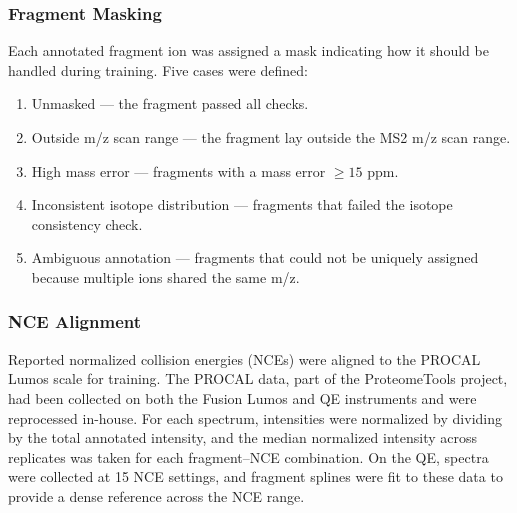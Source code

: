 \documentclass[pdflatex,sn-nature]{sn-jnl}
\begin{document}
\subsubsection{Fragment Masking}
Each annotated fragment ion was assigned a mask indicating how it should be handled during training. Five cases were defined:

\begin{adjustwidth}{2em}{0pt} %
    \begin{enumerate}
      \item Unmasked --- the fragment passed all checks.
      \item Outside m/z scan range --- the fragment lay outside the MS2 m/z scan range.
      \item High mass error --- fragments with a mass error $\geq15$ ppm.
      \item Inconsistent isotope distribution --- fragments that failed the isotope consistency check.
      \item Ambiguous annotation --- fragments that could not be uniquely assigned because multiple ions shared the same m/z.
    \end{enumerate}
\end{adjustwidth}
	
\subsubsection{NCE Alignment}
Reported normalized collision energies (NCEs) were aligned to the PROCAL Lumos scale for training. The PROCAL data, part of the ProteomeTools project, had been collected on both the Fusion Lumos and QE instruments and were reprocessed in-house. For each spectrum, intensities were normalized by dividing by the total annotated intensity, and the median normalized intensity across replicates was taken for each fragment–NCE combination. On the QE, spectra were collected at 15 NCE settings, and fragment splines were fit to these data to provide a dense reference across the NCE range.
\end{document}
